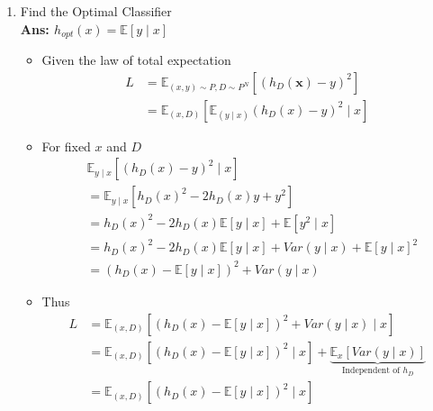 \documentclass{article}
\theoremstyle{definition}
\theoremstyle{remark}
\begin{document}
\begin{enumerate}[font={\Large\bfseries},left=0pt]
	\begin{enumerate}
		\item Find the Optimal Classifier \\
		      \textbf{Ans: $h_{opt}(x)  =  \mathbb{E}\left[ y \mid x\right]$} \\
		      \begin{itemize}
			      \item Given the law of total expectation
			            \begin{align}
				            L & = \mathbb{E}_{(x, y)\sim P, D\sim P^N}\left[(h_D(\boldsymbol{x}) - y)^2\right] \\
				              & = \mathbb{E}_{(x, D)}\left[\mathbb{E}_{(y \mid x)}(h_D(x) - y)^2 \mid x\right]
			            \end{align}
			      \item For fixed $x$ and $D$
			            \begin{align}
				             & \mathbb{E}_{y \mid x}\left[(h_D(x) - y)^2 \mid x \right]                                                 \\
				             & =\mathbb{E}_{y \mid x} \left[h_D(x)^2 - 2h_D(x)y + y^2\right]                                            \\
				             & = h_D(x)^2 - 2h_D(x)\mathbb{E}\left[ y \mid x\right] + \mathbb{E}\left[y^2 \mid x\right]                 \\
				             & = h_D(x)^2 - 2h_D(x)\mathbb{E}\left[ y \mid x\right] + Var(y \mid x) + \mathbb{E}\left[y \mid x\right]^2 \\
				             & = \left(h_D(x) - \mathbb{E}\left[ y \mid x\right]\right)^2 + Var(y \mid x)
			            \end{align}
			      \item Thus
			            \begin{align}
				            L & =  \mathbb{E}_{(x, D)}\left[\left(h_D(x) - \mathbb{E}\left[ y \mid x\right]\right)^2 + Var(y \mid x)\mid x\right]                                                                         \\
				              & =  \mathbb{E}_{(x, D)}\left[\left(h_D(x) - \mathbb{E}\left[ y \mid x\right]\right)^2 \mid  x \right] + \underbrace{\mathbb{E}_{x}\left[ Var(y \mid x)\right]}_{\text{Independent of }h_D} \\
				              & =  \mathbb{E}_{(x, D)}\left[\left(h_D(x) - \mathbb{E}\left[ y \mid x\right]\right)^2 \mid  x \right]
			            \end{align}

\end{itemize}
\end{enumerate}
\end{enumerate}
\end{document}
